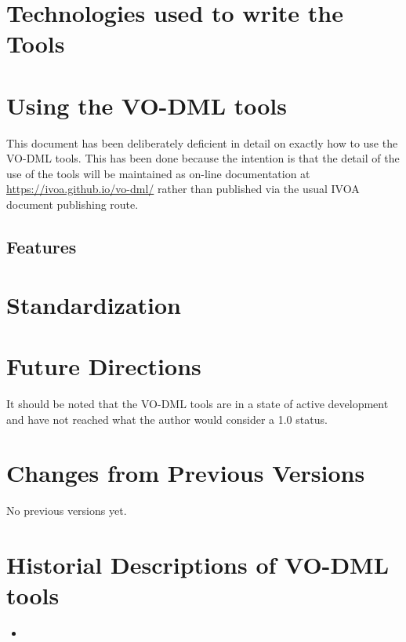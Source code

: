 \documentclass[11pt,a4paper]{ivoa}
\begin{document}
\section{Technologies used to write the Tools}

\section{Using the VO-DML tools}

This document has been deliberately deficient in detail on exactly how to use the VO-DML tools.
This has been done because the intention is that the detail of the use of the tools will be maintained
as on-line documentation at \url{https://ivoa.github.io/vo-dml/} rather than published via the usual IVOA document publishing route.

\subsection{Features}

\section{Standardization}

\section{Future Directions}

It should be noted that the VO-DML tools are in a state of active development and have not reached what the author would consider a 1.0 status.





\appendix
\section{Changes from Previous Versions}

No previous versions yet.

\section{Historial Descriptions of VO-DML tools}

\begin{itemize}
    \item
\end{itemize}


\end{document}
